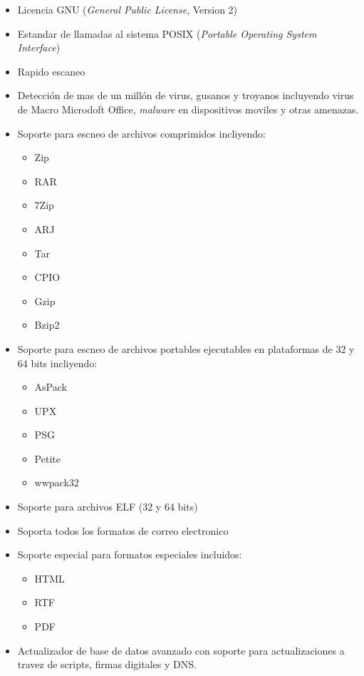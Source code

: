 \begin{itemize}
 \item Licencia  GNU (\emph{General Public License}, Version 2)
 \item Estandar de llamadas al sistema POSIX (\emph{Portable Operating System
Interface})
 \item Rapido escaneo
 \item Detección de mas de un millón de  virus, gusanos y troyanos incluyendo
virus de Macro Microdoft Office, \emph{malware} en dispositivos moviles y otras
amenazas.
\item Soporte para  escneo de  archivos  comprimidos incliyendo:
 \begin{itemize}
  \item Zip
  \item RAR
  \item 7Zip
  \item ARJ
  \item Tar
  \item CPIO
  \item Gzip
  \item Bzip2
 \end{itemize}
 
 \item Soporte para  escneo de  archivos portables ejecutables en plataformas de
32 y 64 bits incliyendo:
\begin{itemize}
 \item AsPack
 \item UPX
 \item PSG
 \item Petite
 \item wwpack32
\end{itemize}

\item  Soporte para archivos  ELF (32 y 64 bits)

\item  Soporta todos los  formatos de correo electronico

\item Soporte especial para formatos especiales  incluidos:
\begin{itemize}
 \item HTML
 \item RTF
 \item PDF
\end{itemize}
\item Actualizador de base de datos avanzado  con soporte para 
actualizaciones a travez de scripts, firmas digitales  y DNS.

\end{itemize}

